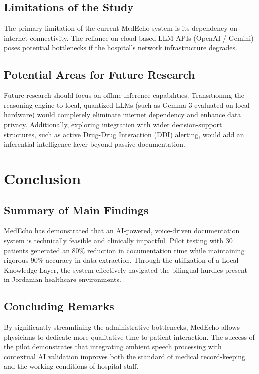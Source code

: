 \documentclass[12pt,a4paper]{article}
\begin{document}
\subsection{Limitations of the Study}
The primary limitation of the current MedEcho system is its dependency on internet connectivity. The reliance on cloud-based LLM APIs (OpenAI / Gemini) poses potential bottlenecks if the hospital's network infrastructure degrades.

\subsection{Potential Areas for Future Research}
Future research should focus on offline inference capabilities. Transitioning the reasoning engine to local, quantized LLMs (such as Gemma 3 evaluated on local hardware) would completely eliminate internet dependency and enhance data privacy. Additionally, exploring integration with wider decision-support structures, such as active Drug-Drug Interaction (DDI) alerting, would add an inferential intelligence layer beyond passive documentation.

\section{Conclusion}
\subsection{Summary of Main Findings}
MedEcho has demonstrated that an AI-powered, voice-driven documentation system is technically feasible and clinically impactful. Pilot testing with 30 patients generated an 80\% reduction in documentation time while maintaining rigorous 90\% accuracy in data extraction. Through the utilization of a Local Knowledge Layer, the system effectively navigated the bilingual hurdles present in Jordanian healthcare environments.

\subsection{Concluding Remarks}
By significantly streamlining the administrative bottlenecks, MedEcho allows physicians to dedicate more qualitative time to patient interaction. The success of the pilot demonstrates that integrating ambient speech processing with contextual AI validation improves both the standard of medical record-keeping and the working conditions of hospital staff.
\end{document}
